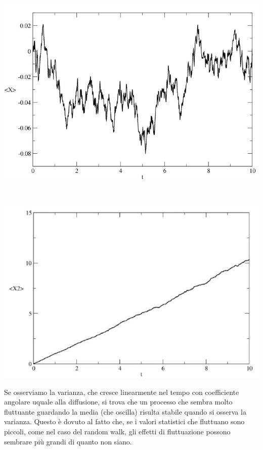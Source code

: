 \documentclass[12pt]{article}
\begin{document}
\begin{center}
  \begin{minipage}[b]{0.4\textwidth}
    \hspace{0cm}\includegraphics[scale=.55]{Media random walk}
  \end{minipage}
  \ \ \ \ \ \ \ \ \ \ \ \ \ \ \ \ \ \ \ 
  \begin{minipage}[b]{0.4\textwidth}
    \hspace{-1cm}\includegraphics[scale=.65]{Varianza random walk} 
  \end{minipage}
\end{center}
Se osserviamo la varianza, che cresce linearmente nel tempo con coefficiente angolare uquale alla diffusione, si trova che un processo che sembra molto fluttuante guardando la media (che oscilla) risulta stabile quando si osserva la varianza. Questo è dovuto al fatto che, se i valori statistici che fluttuano sono piccoli, come nel caso del random walk, gli effetti di fluttuazione possono sembrare più grandi di quanto non siano. \\ \\
\end{document}
